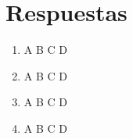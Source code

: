 \documentclass[a4paper,12pt]{article}
\begin{document}
\section*{Respuestas}

\begin{multicols}{4}
  \large
  \begin{enumerate}[label=]
    \item A \hspace*{0.1mm} B \hspace*{0.1mm} C \hspace*{0.1mm} D
    \item A \hspace*{0.1mm} B \hspace*{0.1mm} C \hspace*{0.1mm} D
    \item A \hspace*{0.1mm} B \hspace*{0.1mm} C \hspace*{0.1mm} D
    \item A \hspace*{0.1mm} B \hspace*{0.1mm} C \hspace*{0.1mm} D
  \end{enumerate}
\end{multicols}
\end{document}
